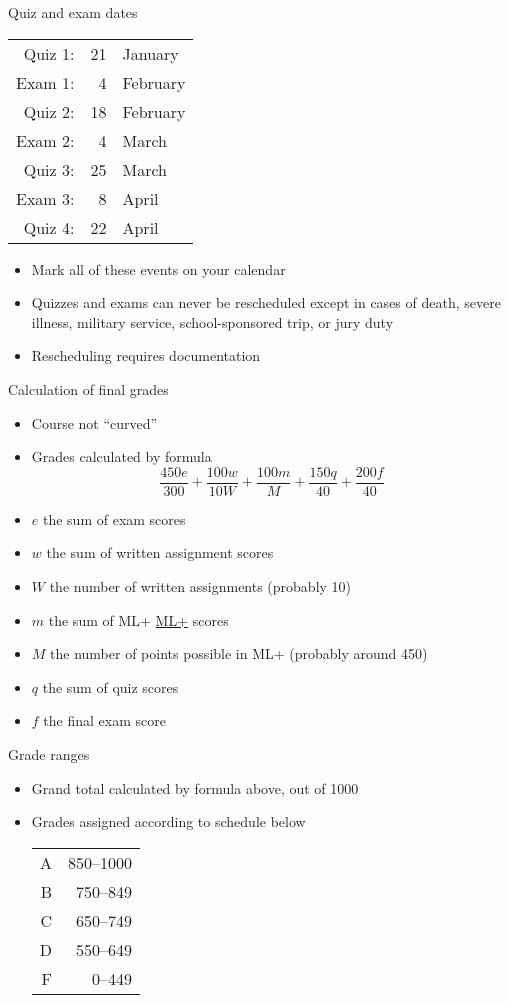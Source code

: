 \documentclass[xcolor=dvipsnames]{beamer}
\theoremstyle{definition}
\begin{document}
\begin{frame}{Quiz and exam dates}
\begin{center}\begin{tabular}{rrl}
Quiz 1:&21&January\\
Exam 1:&4&February\\
Quiz 2:&18&February\\
Exam 2:&4&March\\
Quiz 3:&25&March\\
Exam 3:&8&April\\
Quiz 4:&22&April
\end{tabular}\end{center}
\begin{itemize}
\item Mark all of these events on your calendar
\item Quizzes and exams can \alert{never} be rescheduled
except in cases of death, severe illness, military service,
school-sponsored trip, or jury duty
\item Rescheduling requires documentation
\end{itemize}
\end{frame}

\begin{frame}{Calculation of final grades}
\begin{itemize}
\item Course not ``curved''
\item Grades calculated by formula
\[\frac{450e}{300}+\frac{100w}{10W}
+\frac{100m}{M}+\frac{150q}{40}+\frac{200f}{40}\]
\item $e$ the sum of exam scores
\item $w$ the sum of written assignment scores
\item $W$ the number of written assignments (probably 10)
\item $m$ the sum of ML+
\href{http://iastate.mylabsplus.com}{\color{blue}ML+} scores
\item $M$ the number of points possible in ML+ (probably around 450)
\item $q$ the sum of quiz scores
\item $f$ the final exam score
\end{itemize}
\end{frame}

\begin{frame}{Grade ranges}
\begin{itemize}
\item Grand total calculated by formula above, out of 1000
\item Grades assigned according to schedule below
\begin{center}\begin{tabular}{rr}
A&850--1000\\
B&750--849\\
C&650--749\\
D&550--649\\
F&0--449
\end{tabular}\end{center}
\end{itemize}
\end{frame}
\end{document}
